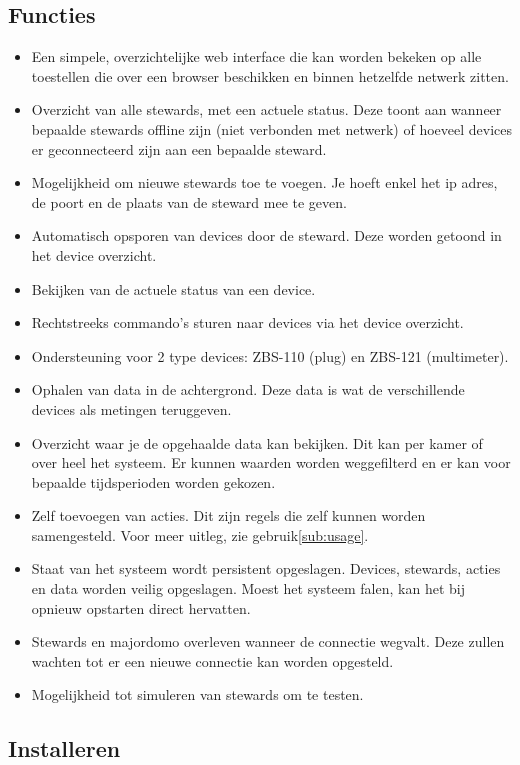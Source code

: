 \documentclass{article}
\begin{document}
\subsection{Functies}
\label{sub:features}
\begin{itemize}
\item Een simpele, overzichtelijke web interface die kan worden bekeken op alle toestellen die over een browser beschikken en binnen hetzelfde netwerk zitten.
\item Overzicht van alle stewards, met een actuele status. Deze toont aan wanneer bepaalde stewards offline zijn (niet verbonden met netwerk) of hoeveel devices er geconnecteerd zijn aan een bepaalde steward.
\item Mogelijkheid om nieuwe stewards toe te voegen. Je hoeft enkel het ip adres, de poort en de plaats van de steward mee te geven.
\item Automatisch opsporen van devices door de steward. Deze worden getoond in het device overzicht.
\item Bekijken van de actuele status van een device.
\item Rechtstreeks commando's sturen naar devices via het device overzicht. 
\item Ondersteuning voor 2 type devices: ZBS-110 (plug) en ZBS-121 (multimeter).
\item Ophalen van data in de achtergrond. Deze data is wat de verschillende devices als metingen teruggeven.
\item Overzicht waar je de opgehaalde data kan bekijken. Dit kan per kamer of over heel het systeem. Er kunnen waarden worden weggefilterd en er kan voor bepaalde tijdsperioden worden gekozen.
\item Zelf toevoegen van acties. Dit zijn regels die zelf kunnen worden samengesteld. Voor meer uitleg, zie gebruik\ref{sub:usage}.
\item Staat van het systeem wordt persistent opgeslagen. Devices, stewards, acties en data worden veilig opgeslagen. Moest het systeem falen, kan het bij opnieuw opstarten direct hervatten.
\item Stewards en majordomo overleven wanneer de connectie wegvalt. Deze zullen wachten tot er een nieuwe connectie kan worden opgesteld.
\item Mogelijkheid tot simuleren van stewards om te testen.
\end{itemize}

\subsection{Installeren}
\label{sub:install}
\end{document}
